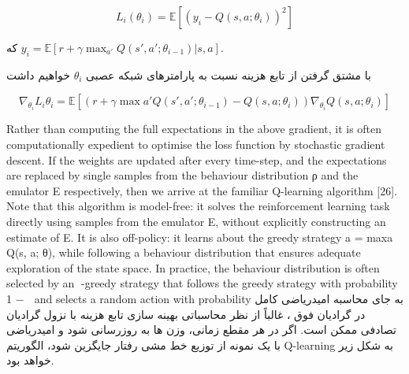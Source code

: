 $$L_i(\theta_i)=\mathbb{E}\left[(y_i - Q(s,a;\theta_i))^2\right]$$

که 
$y_i = \mathbb{E}[r + \gamma \max_{a'} Q(s',a'; \theta_{i-1})| s,a]$.

با مشتق گرفتن از تابع هزینه نسبت به پارامترهای شبکه عصبی $\theta_i$ خواهیم داشت

$$\nabla_{\theta_i} L_i{\theta_i} = \mathbb{E}\left[ \left(r + \gamma \max{a'} Q(s',a';\theta_{i-1}) - Q(s,a;\theta_i)\right) \nabla_{\theta_i} Q(s,a;\theta_i)\right]$$

Rather than computing the full expectations in the above gradient, it is often computationally expedient to optimise the loss function by stochastic gradient descent. If the weights are updated after
every time-step, and the expectations are replaced by single samples from the behaviour distribution
ρ and the emulator E respectively, then we arrive at the familiar Q-learning algorithm [26].
Note that this algorithm is model-free: it solves the reinforcement learning task directly using samples from the emulator E, without explicitly constructing an estimate of E. It is also off-policy: it
learns about the greedy strategy a = maxa Q(s, a; θ), while following a behaviour distribution that
ensures adequate exploration of the state space. In practice, the behaviour distribution is often selected by an -greedy strategy that follows the greedy strategy with probability 1 −  and selects a
random action with probability \epsilon
به جای محاسبه امیدریاضی کامل در گرادیان فوق ، غالباً از نظر محاسباتی بهینه سازی تابع هزینه با نزول گرادیان تصادفی   ممکن است. اگر در هر مقطع زمانی، وزن ها به روزرسانی شود و امیدریاضی با یک نمونه از توزیع خط مشی رفتار  جایگزین شود، الگوریتم Q-learning به شکل زیر خواهد بود.


